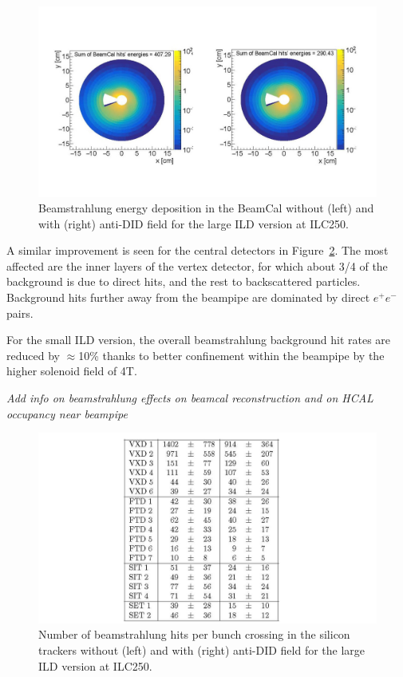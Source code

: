 \begin{figure}[t!]
\includegraphics[width=1.0\hsize]{Integration/fig/BG_beamcal.jpg}
\caption{\label{fig:integration:beamcal}Beamstrahlung energy deposition in the BeamCal without (left) and with (right) anti-DID field for the large ILD version at ILC250. }
\end{figure}

A similar improvement is seen for the central detectors in Figure~\ref{fig:integration:rates}. The most affected are the inner layers of the vertex detector, for which about 3/4 of the background is due to direct hits, and the rest to backscattered particles. Background hits further away from the beampipe are dominated by direct $e^+e^-$ pairs. 

For the small ILD version, the overall beamstrahlung background hit rates are reduced by $\approx$10\%  thanks to better confinement within the beampipe by the higher solenoid field of 4T.

\textit{Add info on beamstrahlung effects on beamcal reconstruction and on HCAL occupancy near beampipe}

\begin{figure}[t!]
\includegraphics[width=0.8\hsize]{Integration/fig/BG_rates.jpg}
\caption{\label{fig:integration:rates}Number of beamstrahlung hits per bunch crossing in the silicon trackers without (left) and with (right) anti-DID field for the large ILD version at ILC250.}
\end{figure}

